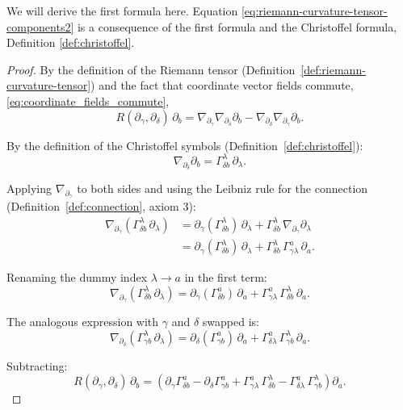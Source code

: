 We will derive the first formula here. Equation \eqref{eq:riemann-curvature-tensor-components2} is a consequence of the first formula and the Christoffel formula, Definition \ref{def:christoffel}.

\begin{proof}

By the definition of the Riemann tensor (Definition~\ref{def:riemann-curvature-tensor}) and the fact that coordinate vector fields commute, \eqref{eq:coordinate_fields_commute},
\[
R(\partial_\gamma, \partial_\delta)\,\partial_b = \nabla_{\partial_\gamma} \nabla_{\partial_\delta} \partial_b - \nabla_{\partial_\delta} \nabla_{\partial_\gamma} \partial_b.
\]

By the definition of the Christoffel symbols (Definition~\ref{def:christoffel}):
\[
\nabla_{\partial_\delta} \partial_b = \Gamma^\lambda_{\delta b}\,\partial_\lambda.
\]

Applying $\nabla_{\partial_\gamma}$ to both sides and using the Leibniz rule for the connection (Definition~\ref{def:connection}, axiom 3):
\begin{align*}
\nabla_{\partial_\gamma}\!\left(\Gamma^\lambda_{\delta b}\,\partial_\lambda\right) 
&= \partial_\gamma\!\left(\Gamma^\lambda_{\delta b}\right)\,\partial_\lambda + \Gamma^\lambda_{\delta b}\,\nabla_{\partial_\gamma}\partial_\lambda \\
&= \partial_\gamma\!\left(\Gamma^\lambda_{\delta b}\right)\,\partial_\lambda + \Gamma^\lambda_{\delta b}\,\Gamma^a_{\gamma\lambda}\,\partial_a.
\end{align*}

Renaming the dummy index $\lambda \to a$ in the first term:
\[
\nabla_{\partial_\gamma}\!\left(\Gamma^\lambda_{\delta b}\,\partial_\lambda\right) = \partial_\gamma\!\left(\Gamma^a_{\delta b}\right)\,\partial_a + \Gamma^a_{\gamma\lambda}\,\Gamma^\lambda_{\delta b}\,\partial_a.
\]

The analogous expression with $\gamma$ and $\delta$ swapped is:
\[
\nabla_{\partial_\delta}\!\left(\Gamma^\lambda_{\gamma b}\,\partial_\lambda\right) = \partial_\delta\!\left(\Gamma^a_{\gamma b}\right)\,\partial_a + \Gamma^a_{\delta\lambda}\,\Gamma^\lambda_{\gamma b}\,\partial_a.
\]

Subtracting:
\[
R(\partial_\gamma, \partial_\delta)\,\partial_b = \left(\partial_\gamma \Gamma^a_{\delta b} - \partial_\delta \Gamma^a_{\gamma b} + \Gamma^a_{\gamma\lambda}\,\Gamma^\lambda_{\delta b} - \Gamma^a_{\delta\lambda}\,\Gamma^\lambda_{\gamma b}\right)\partial_a.
\]


\end{proof}
